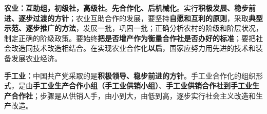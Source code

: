 \textbf{农业：互助组，初级社，高级社}。\textbf{先合作化、后机械化}。实行\textbf{积极发展、稳步前进、逐步过渡的方针}；农业互助合作的发展，要坚持\textbf{自愿和互利的原则}，采取\textbf{典型示范、逐步推广的方法}，发展一批，巩固一批；正确分析农村的阶级和阶层状况，制定正确的阶级政策。要始终\textbf{把是否增产作为衡量合作社是否办好的标准}；要把社会改造同技术改造相结合。在实现农业合作化\textbf{{以后}}，国家应努力用先进的技术和装备发展农业经济。

\textbf{手工业：}{中国共产党采取的是}\textbf{积极领导、稳步前进的方针}{。手工业合作化的组织形式，是由}\textbf{手工业生产合作小组（手工业供销小组）}{、}\textbf{手工业供销合作社到手工业生产合作社}{；步骤是从供销人手，由小到大，由低到高，逐步实行社会主义改造和生产改造。}
